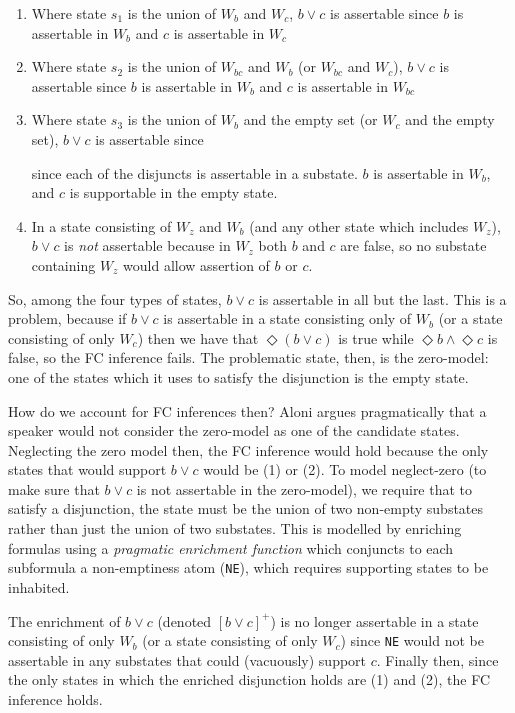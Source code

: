 \begin{enumerate}
\item Where state $s_1$ is the union of $W_b$ and $W_c$, $b\vee c$ is assertable since $b$ is assertable in $W_b$ and $c$ is assertable in $W_c$
\item Where state $s_2$ is the union of $W_{bc}$ and $W_b$ (or $W_{bc}$ and $W_c$), $b\vee c$ is assertable since $b$ is assertable in $W_b$ and $c$ is assertable in $W_{bc}$
\item Where state $s_3$ is the union of $W_b$ and the empty set (or $W_c$ and the empty set), $b\vee c$ is assertable since 


since each of the
disjuncts is assertable in a substate. $b$ is assertable in $W_b$, and $c$ is supportable in the empty state.
\item In a state consisting of $W_z$ and $W_b$ (and any other state which includes $W_z$), $b\vee c$ is
\textit{not} assertable because in $W_z$ both $b$ and $c$ are false, so no substate containing $W_z$ would allow assertion of $b$ or $c$.
\end{enumerate}

So, among the four types of states, $b\vee c$ is assertable in all but the last. This is a problem, because if
$b\vee c$ is assertable in a state consisting only of $W_b$ (or a state consisting of only $W_c$) then we have
that $\Diamond(b\vee c)$ is true while $\Diamond b \wedge \Diamond c$ is false, so the FC inference fails. The
problematic state, then, is the zero-model: one of the states which it uses to satisfy the disjunction is the
empty state.

How do we account for FC inferences then? Aloni argues pragmatically that a speaker would not consider the
zero-model as one of the candidate states. Neglecting the zero model then, the FC inference would hold
because the only states that would support $b\vee c$ would be (1) or (2). To model neglect-zero (to make
sure that $b\vee c$ is not assertable in the zero-model), we require that to satisfy a disjunction, the state
must be the union of two non-empty substates rather than just the union of two substates. 
This is modelled by enriching formulas using a \emph{pragmatic enrichment function} which conjuncts to each subformula a non-emptiness atom (\verb|NE|), which requires supporting states to be inhabited.

The enrichment of $b \vee c$ (denoted $[b\vee c]^+$) is no longer assertable in a state consisting of only $W_b$
(or a state consisting of only $W_c$) since \verb|NE| would not be assertable in any substates that could (vacuously) support $c$.
Finally then, since the only states in which the enriched disjunction holds are (1) and (2), the FC inference holds.

